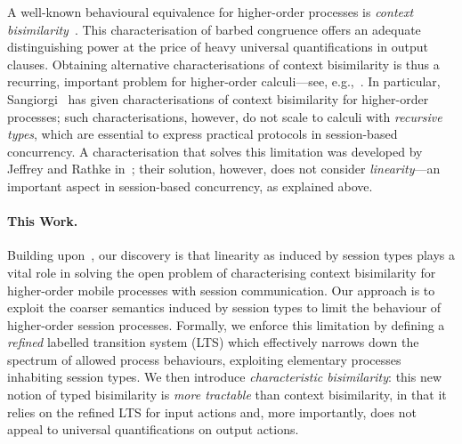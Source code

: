 A well-known behavioural equivalence for higher-order processes
is \emph{context bisimilarity}~\cite{San96H}. This 
 characterisation of %
barbed congruence 
offers an adequate distinguishing power at the price of heavy universal quantifications in output clauses.
Obtaining alternative 
characterisations of context bisimilarity
is thus a recurring, important problem 
for higher-order calculi---see, e.g.,~\cite{SangiorgiD:expmpa,San96H,JeffreyR05,DBLP:journals/cl/KoutavasH12,DBLP:journals/corr/Xu13a,lenglet_et_al:LIPIcs:2015:5364}. 
In particular, Sangiorgi~\cite{SangiorgiD:expmpa,San96H} has 
given %
characterisations of context bisimilarity
for higher-order processes; such 
characterisations, however,  %
do not scale to  
  calculi with \emph{recursive types}, which %
  are essential to %
  express practical protocols in 
session-based concurrency. A characterisation  
that solves this limitation was developed by Jeffrey and Rathke in~\cite{JeffreyR05};
their solution, however, does not consider \emph{linearity}---an important aspect in session-based concurrency, as explained above.


\paragraph{This Work.}
Building upon~\cite{SangiorgiD:expmpa,San96H,JeffreyR05}, 
our discovery is that {linearity} as induced by session types plays a vital role 
% 
in 
solving 
the %
open problem 
of characterising context bisimilarity for higher-order mobile processes with session communication.
Our approach is to exploit 
the coarser semantics induced by session types to limit
the behaviour of higher-order session processes. 
 Formally, we enforce this limitation by defining
a \emph{refined} labelled transition system (LTS)
which effectively 
narrows down the spectrum of allowed process behaviours, 
exploiting elementary processes inhabiting session types.
We then introduce \emph{characteristic bisimilarity}: this  
 new notion of typed bisimilarity   is 
\emph{more tractable} than context bisimilarity, in that 
it relies on the refined LTS for input actions and, more importantly, 
does not appeal to universal quantifications on output actions. 

